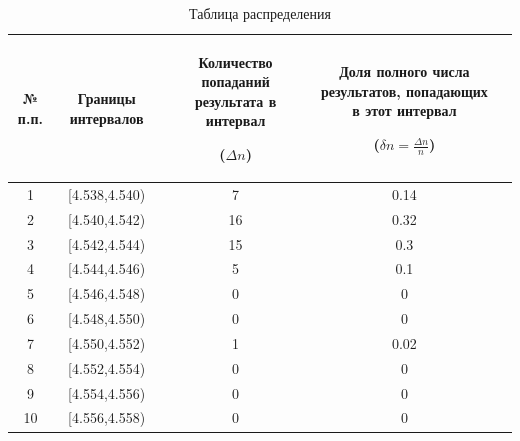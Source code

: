 \begin{center}
\begin{table}[h!]
\centering
\caption{Таблица распределения}
\label{tabl:11}
\begin{tabular}{|c|c|c|c|c|}
\hline
\begin{minipage}{1cm}
    № п.п.
\end{minipage}&
\begin{minipage}{5cm}
    Границы интервалов
\end{minipage} &
\begin{minipage}{5cm}
    Количество попаданий результата в интервал

    ($\Delta n$)
\end{minipage} &
\begin{minipage}{5cm}
    Доля полного числа результатов, попадающих в этот интервал
    
    ($\delta n=\frac{\Delta n}{n}$)
\end{minipage}\\
\hline
1 &  [4.538,4.540)  &  7 & 0.14 \\
2 &  [4.540,4.542)  &  16 & 0.32 \\
3 &  [4.542,4.544)  &  15 & 0.3 \\
4 &  [4.544,4.546)  &  5 & 0.1 \\
5 &  [4.546,4.548) &  0 & 0 \\
6 &  [4.548,4.550)  &  0 & 0 \\
7 &  [4.550,4.552)  &  1 & 0.02 \\
8 &  [4.552,4.554)  &  0 & 0 \\
9 &  [4.554,4.556)  &  0 & 0 \\
10 &  [4.556,4.558)  &  0 & 0 \\
\hline
\end{tabular}
\end{table}
\end{center}

